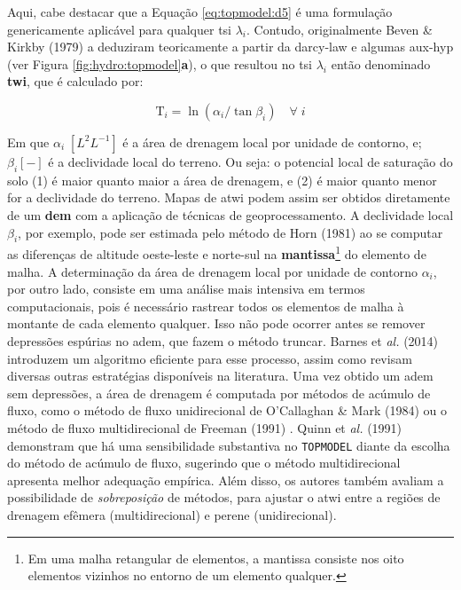 \documentclass[./main.tex]{subfiles}
\begin{document}
\par Aqui, cabe destacar que a Equação \eqref{eq:topmodel:d5} é uma formulação genericamente aplicável para qualquer \gls{tsi} $\lambda_{i}$. Contudo, originalmente Beven \& Kirkby (1979) a deduziram teoricamente a partir da \gls{darcy-law} e algumas \gls{aux-hyp} (ver Figura \ref{fig:hydro:topmodel}\textbf{a}), o que resultou no \gls{tsi} $\lambda_{i}$ então denominado \textbf{\gls{twi}}, que é calculado por:
\begin{linenomath*}
\begin{equation}
\label{eq:topmodel:twi}
\text{T}_{i}  = \ln{(\alpha_{i}/\tan \beta_{i})} \quad \forall \; i
\end{equation}
\end{linenomath*}
Em que $\alpha_{i}\; [L^{2}L^{-1}]$ é a área de drenagem local por unidade de contorno, e;  $\beta_{i} [-]$ é a declividade local do terreno. Ou seja: o potencial local de saturação do solo (1)  é maior quanto maior a área de drenagem, e (2) é maior quanto menor for a declividade do terreno. Mapas de \acrshort{atwi} podem assim ser obtidos diretamente de um \textbf{\gls{dem}} com a aplicação de técnicas de geoprocessamento. A declividade local $\beta_{i}$, por exemplo, pode ser estimada pelo método de Horn (1981) \cite{Horn1981a} ao se computar as diferenças de altitude oeste-leste e norte-sul na \textbf{mantissa}\footnote{Em uma malha retangular de elementos, a mantissa consiste nos oito elementos vizinhos no entorno de um elemento qualquer.} do elemento de malha. A determinação da área de drenagem local por unidade de contorno $\alpha_{i}$, por outro lado, consiste em uma análise mais intensiva em termos computacionais, pois é necessário rastrear todos os elementos de malha à montante de cada elemento qualquer. Isso não pode ocorrer antes se remover depressões espúrias no \acrshort{adem}, que fazem o método truncar. Barnes et \textit{al.} (2014) \cite{Barnes2014a} introduzem um algoritmo eficiente para esse processo, assim como revisam diversas outras estratégias disponíveis na literatura. Uma vez obtido um \acrshort{adem} sem depressões, a área de drenagem é computada por métodos de acúmulo de fluxo, como o método de fluxo unidirecional de O'Callaghan \& Mark (1984) \cite{Ocallaghan1984a} ou o método de fluxo multidirecional de Freeman (1991) \cite{Freeman1991a}. Quinn et \textit{al.} (1991) \cite{Quinn1991b} demonstram que há uma sensibilidade substantiva no \texttt{TOPMODEL} diante da escolha do método de acúmulo de fluxo, sugerindo que o método multidirecional apresenta melhor adequação empírica. Além disso, os autores também avaliam a possibilidade de \textit{sobreposição} de métodos, para ajustar o \acrshort{atwi} entre a regiões de drenagem efêmera (multidirecional) e perene (unidirecional).
\end{document}
